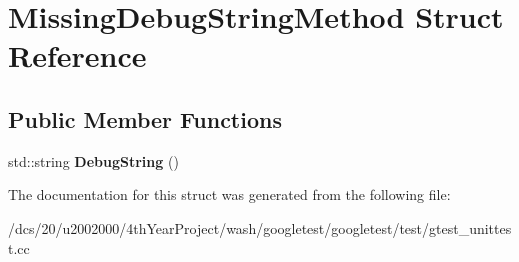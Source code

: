 \hypertarget{structMissingDebugStringMethod}{}\section{Missing\+Debug\+String\+Method Struct Reference}
\label{structMissingDebugStringMethod}
\subsection*{Public Member Functions}
\begin{DoxyCompactItemize}
\item 
\mbox{\label{structMissingDebugStringMethod_a46ccdf27cb4b52d31939b05f70c5527e}} 
std\+::string {\bfseries Debug\+String} ()
\end{DoxyCompactItemize}


The documentation for this struct was generated from the following file\+:\begin{DoxyCompactItemize}
\item 
/dcs/20/u2002000/4th\+Year\+Project/wash/googletest/googletest/test/gtest\+\_\+unittest.\+cc\end{DoxyCompactItemize}
